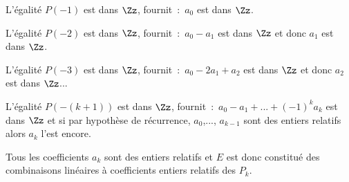 {\begin{enumerate}
{L'égalité $P(-1)$ est dans $\Zz$, fournit~:~$a_0$ est dans $\Zz$.

L'égalité $P(-2)$ est dans $\Zz$, fournit~:~$a_0-a_1$ est dans $\Zz$ et donc $a_1$ est dans $\Zz$.

L'égalité $P(-3)$ est dans $\Zz$, fournit~:~$a_0-2a_1+a_2$ est dans $\Zz$ et donc $a_2$ est dans $\Zz$...

L'égalité $P(-(k+1))$ est dans $\Zz$, fournit~:~$a_0-a_1+...+(-1)^ka_k$ est dans $\Zz$ et si par hypothèse de récurrence, $a_0$,..., $a_{k-1}$ sont des entiers relatifs alors $a_k$ l'est encore.

Tous les coefficients $a_k$ sont des entiers relatifs et $E$ est donc constitué des combinaisons linéaires à coefficients entiers relatifs des $P_k$.}
\end{enumerate}
}